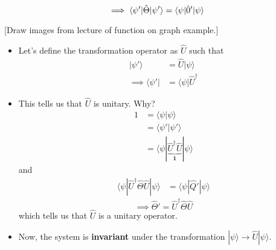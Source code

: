 \documentclass{article}
\newcommand{\ket}[1]{|#1 \rangle}
\newcommand{\bra}[1]{\langle #1|}
\newcommand{\inner}[2]{\langle #1 | #2 \rangle}
\begin{document}
\[ \implies \inner{\psi'}{\hat{\Theta}| \psi'} = \inner{\psi}{\hat{\theHtable}'|\psi} \]

\vskip 0.5cm
[Draw images from lecture of function on graph example.]

\begin{itemize}
  \item Let's define the transformation operator as $\hat{U}$ such that 
  \begin{align*}
    \ket{\psi'} &= \hat{U} \ket{\psi} \\
    \implies \bra{\psi'} &= \bra{\psi} \hat{U}^{\dagger}
  \end{align*}

  \item This tells us that $\hat{U}$ is unitary. Why? 
  \begin{align*}
    1 &= \inner{\psi}{\psi} \\
    &= \inner{\psi'}{\psi'} \\
    &= \inner{\psi|\underbrace{\hat{U}^{\dagger} \hat{U} }_{\mathbf{1}}}{\psi}
  \end{align*}
  and 
  \begin{align*}
    \inner{\psi|\hat{U}^{\dagger} \hat{\Theta} \hat{U} }{\psi} &= \inner{\psi}{\hat{Q}' | \psi} 
  \end{align*}
  \[ \implies \hat{\Theta}' = \hat{U}^{\dagger} \hat{\Theta} \hat{U} \]
  which tells us that $\hat{U}$ is a unitary operator.

  \item Now, the system is \textbf{invariant} under the transformation $\ket{\psi} \rightarrow \hat{U} \ket{\psi}$.
\end{itemize}
\end{document}
